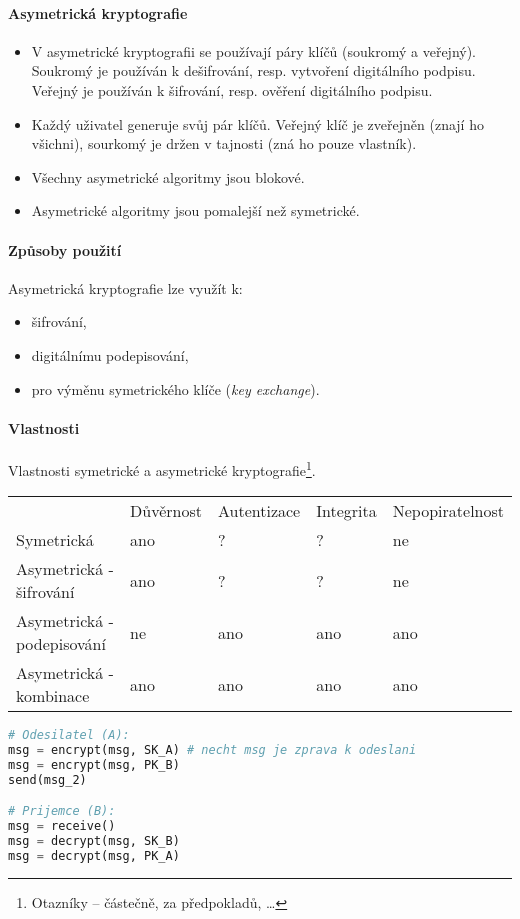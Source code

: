\paragraph*{Asymetrická kryptografie} \begin{itemize}
    \item V asymetrické kryptografii se používají páry klíčů (soukromý a veřejný). Soukromý je používán k dešifrování, resp. vytvoření digitálního podpisu. Veřejný je používán k šifrování, resp. ověření digitálního podpisu.
    \item Každý uživatel generuje svůj pár klíčů. Veřejný klíč je zveřejněn (znají ho všichni), sourkomý je držen v tajnosti (zná ho pouze vlastník).
    \item Všechny asymetrické algoritmy jsou blokové.
    \item Asymetrické algoritmy jsou pomalejší než symetrické.
\end{itemize}

\paragraph*{Způsoby použití} Asymetrická kryptografie lze využít k: \begin{itemize}
    \item šifrování,
    \item digitálnímu podepisování,
    \item pro výměnu symetrického klíče (\textit{key exchange}).
\end{itemize}

\paragraph*{Vlastnosti} Vlastnosti symetrické a asymetrické kryptografie\footnote{Otazníky -- částečně, za předpokladů, \dots}.
\begin{table}[H]
\begin{tabular}{lllll}
& Důvěrnost & Autentizace & Integrita & Nepopiratelnost \\
Symetrická & ano & ? & ? & ne \\
Asymetrická - šifrování & ano & ? & ? & ne \\
Asymetrická - podepisování & ne & ano & ano & ano \\
Asymetrická - kombinace & ano & ano & ano & ano
\end{tabular}
\end{table}

\bigskip\noindent\begin{minipage}{\linewidth}
\begin{lstlisting}[language=Python, caption={Kombinace klíčů obou stran u asymetrický kryptografie. Pořadí operací může být i opačné.}]
# Odesilatel (A):
msg = encrypt(msg, SK_A) # necht msg je zprava k odeslani
msg = encrypt(msg, PK_B)
send(msg_2)

# Prijemce (B):
msg = receive()
msg = decrypt(msg, SK_B)
msg = decrypt(msg, PK_A)
\end{lstlisting}
\end{minipage}

